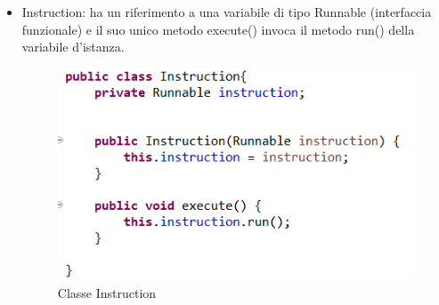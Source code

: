 \documentclass{article}
\begin{document}
\begin{itemize}
\item Instruction: ha un riferimento a una variabile di tipo Runnable (interfaccia funzionale) e il suo unico metodo execute() invoca il metodo run() della variabile d'istanza. 
\begin{figure} [H]
\begin{center}
\includegraphics[scale=0.8]{Instruction.png}
\end{center}
\caption{Classe Instruction}
\end{figure}


\end{itemize}
\end{document}
